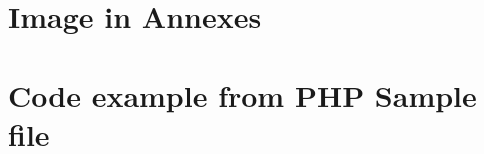 \section{Image in Annexes}
	\newpage
\section{Code example from PHP Sample file}
	\begin{listing}[H]
	    \inputminted[breaklines,linenos]{php}{code/ppt.php}
	    \label{code:php-example}
    \end{listing}
\clearpage
